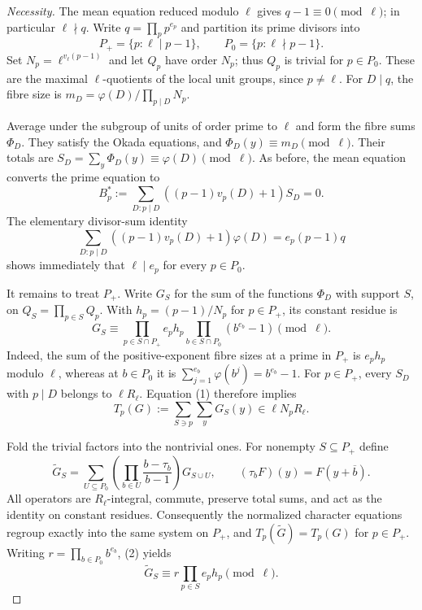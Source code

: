 \documentclass[11pt]{amsart}
\theoremstyle{definition}
\theoremstyle{remark}
\numberwithin{equation}{section}
\begin{document}
\begin{proof}[Necessity]
The mean equation reduced modulo $\ell$ gives $q-1\equiv0\pmod\ell$;
in particular $\ell\nmid q$. Write $q=\prod_pp^{e_p}$ and partition its
prime divisors into
\[
 P_+=\{p:\ell\mid p-1\},\qquad P_0=\{p:\ell\nmid p-1\}.
\]
Set $N_p=\ell^{v_\ell(p-1)}$ and let $Q_p$ have order $N_p$;
thus $Q_p$ is trivial for $p\in P_0$. These are the maximal
$\ell$-quotients of the local unit groups, since $p\ne\ell$.
For $D\mid q$, the fibre size is
$m_D=\varphi(D)/\prod_{p\mid D}N_p$.

Average under the subgroup of units of order prime to $\ell$ and form
the fibre sums $\Phi_D$. They satisfy the Okada equations, and
$\Phi_D(y)\equiv m_D\pmod\ell$. Their totals are
$S_D=\sum_y\Phi_D(y)\equiv\varphi(D)\pmod\ell$.
As before, the mean equation converts the prime equation to
\[
 B_p^*:=\sum_{D:p\mid D}((p-1)v_p(D)+1)S_D=0.                 \tag{\thesection.1}
\]
The elementary divisor-sum identity
\[
 \sum_{D:p\mid D}((p-1)v_p(D)+1)\varphi(D)=e_p(p-1)q
\]
shows immediately that $\ell\mid e_p$ for every $p\in P_0$.

It remains to treat $P_+$. Write $G_S$ for the sum of the functions
$\Phi_D$ with support $S$, on $Q_S=\prod_{p\in S}Q_p$.
With $h_p=(p-1)/N_p$ for $p\in P_+$,
its constant residue is
\[
 G_S\equiv
 \prod_{p\in S\cap P_+}e_ph_p
 \prod_{b\in S\cap P_0}(b^{e_b}-1)\pmod\ell.                 \tag{\thesection.2}
\]
Indeed, the sum of the positive-exponent fibre sizes at a prime in
$P_+$ is $e_ph_p$ modulo $\ell$, whereas at $b\in P_0$ it is
$\sum_{j=1}^{e_b}\varphi(b^j)=b^{e_b}-1$.
For $p\in P_+$, every $S_D$ with $p\mid D$ belongs to $\ell R_\ell$.
Equation (1) therefore implies
\[
 T_p(G):=\sum_{S\ni p}\sum_yG_S(y)\in\ell N_pR_\ell.         \tag{\thesection.3}
\]

Fold the trivial factors into the nontrivial ones. For nonempty
$S\subseteq P_+$ define
\[
 \widetilde G_S=
 \sum_{U\subseteq P_0}
 \left(\prod_{b\in U}\frac{b-\tau_b}{b-1}\right)G_{S\cup U},
 \qquad (\tau_bF)(y)=F(y+\overline b).                        \tag{\thesection.4}
\]
All operators are $R_\ell$-integral, commute, preserve total sums,
and act as the identity on constant residues. Consequently the
normalized character equations regroup exactly into the same system
on $P_+$, and $T_p(\widetilde G)=T_p(G)$ for $p\in P_+$.
Writing $r=\prod_{b\in P_0}b^{e_b}$, (2) yields
\[
 \widetilde G_S\equiv r\prod_{p\in S}e_ph_p\pmod\ell.         \tag{\thesection.5}
\]


\end{proof}
\end{document}
